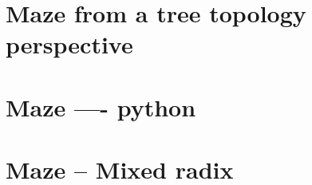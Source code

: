 \section{Maze from a tree topology perspective}
\label{section_models_maze}

\section{Maze ---- python}

\section{Maze -- Mixed radix}